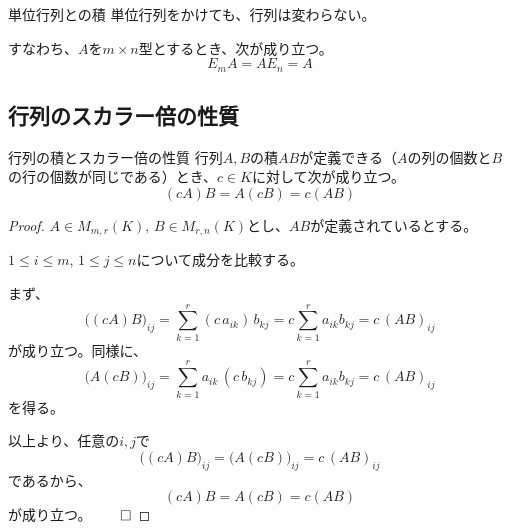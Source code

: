 \documentclass[../../../topic_linear-algebra]{subfiles}
\begin{document}
\begin{theorem*}{単位行列との積}
  単位行列をかけても、行列は変わらない。
  
  すなわち、$A$を$m \times n$型とするとき、次が成り立つ。
  \begin{equation*}
    E_m A = A E_n = A
  \end{equation*}
\end{theorem*}

\subsection{行列のスカラー倍の性質}

\begin{theorem*}{行列の積とスカラー倍の性質}
  行列$A,B$の積$AB$が定義できる（$A$の列の個数と$B$の行の個数が同じである）とき、$c \in K$に対して次が成り立つ。
  \begin{equation*}
    (cA)B = A(cB) = c(AB)
  \end{equation*}
\end{theorem*}

\begin{proof}
  $A\in M_{m,r}(K),\,B\in M_{r,n}(K)$とし、$AB$が定義されているとする。
  
  $1\le i\le m,\,1\le j\le n$について成分を比較する。
  
  \br
  
  まず、
  \begin{equation*}
    \bigl((cA)B\bigr)_{ij}=\sum_{k=1}^{r}(c\,a_{ik})\,b_{kj}
    =c\sum_{k=1}^{r}a_{ik}b_{kj}
    =c\,(AB)_{ij}
  \end{equation*}
  が成り立つ。同様に、
  \begin{equation*}
    \bigl(A(cB)\bigr)_{ij}=\sum_{k=1}^{r}a_{ik}\,(c\,b_{kj})
    =c\sum_{k=1}^{r}a_{ik}b_{kj}
    =c\,(AB)_{ij}
  \end{equation*}
  を得る。
  
  \br
  
  以上より、任意の$i,j$で
  \begin{equation*}
    \bigl((cA)B\bigr)_{ij}=\bigl(A(cB)\bigr)_{ij}=c\,(AB)_{ij}
  \end{equation*}
  であるから、
  \begin{equation*}
    (cA)B=A(cB)=c(AB)
  \end{equation*}
  が成り立つ。$\qed$
\end{proof}
\end{document}
